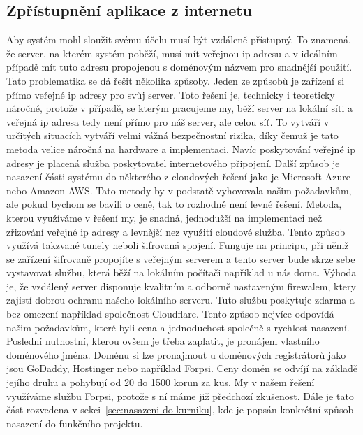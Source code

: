 \subsection{Zpřístupnění aplikace z internetu}\label{subsec:zpristupneni-aplikace-z-internetu}
Aby systém mohl sloužit svému účelu musí být vzdáleně přístupný.
To znamená, že server, na kterém systém poběží, musí mít veřejnou ip adresu a v ideálním případě mít tuto adresu propojenou s doménovým názvem pro snadnější použití.
Tato problematika se dá řešit několika způsoby.\newline
Jeden ze způsobů je zařízení si přímo veřejné ip adresy pro svůj server.
Toto řešení je, technicky i teoreticky náročné, protože v případě, se kterým pracujeme my, běží server na lokální síti a veřejná ip adresa tedy není přímo pro náš server, ale celou síť.
To vytváří v určitých situacích vytváří velmi vážná bezpečnostní rizika, díky čemuž je tato metoda velice náročná na hardware a implementaci.
Navíc poskytování veřejné ip adresy je placená služba poskytovatel internetového připojení.\newline
Další způsob je nasazení části systému do některého z cloudových řešení jako je Microsoft Azure nebo Amazon AWS.
Tato metody by v podstatě vyhovovala našim požadavkům, ale pokud bychom se bavili o ceně, tak to rozhodně není levné řešení. \newline
Metoda, kterou využíváme v řešení my, je snadná, jednodužší na implementaci než zřizování veřejné ip adresy a levnější nez využití cloudové služba.
Tento způsob využívá takzvané tunely neboli šifrovaná spojení.
Funguje na principu, při němž se zařízení šifrovaně propojíte s veřejným serverem a tento server bude skrze sebe vystavovat službu, která běží na lokálním počítači například u nás doma.
Výhoda je, že vzdálený server disponuje kvalitním a odborně nastaveným firewalem, ktery zajistí dobrou ochranu našeho lokálního serveru.
Tuto službu poskytuje zdarma a bez omezení například společnost Cloudflare.
Tento způsob nejvíce odpovídá našim požadavkům, které byli cena a jednoduchost společně s rychlost nasazení.\newline
Poslední nutnostní, kterou ovšem je třeba zaplatit, je pronájem vlastního doménového jména.
Doménu si lze pronajmout u doménových registrátorů jako jsou GoDaddy, Hostinger nebo například Forpsi.
Ceny domén se odvíjí na základě jejího druhu a pohybují od 20 do 1500 korun za kus.
My v našem řešení využíváme službu Forpsi, protože s ní máme již předchozí zkušenost.\newline
Dále je tato část rozvedena v sekci~\ref{sec:nasazeni-do-kurniku}, kde je popsán konkrétní způsob nasazení do funkčního projektu.

